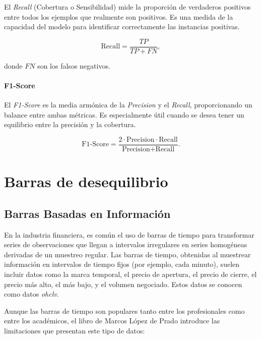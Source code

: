 \documentclass[a4paper,12pt, twoside]{report}
\begin{document}
El \textit{Recall} (Cobertura o Sensibilidad) mide la proporción de verdaderos positivos entre todos los ejemplos que realmente son positivos. Es una medida de la capacidad del modelo para identificar correctamente las instancias positivas.

\begin{equation}
\text{Recall} = \frac{TP}{TP + FN},
\end{equation}

donde $FN$ son los falsos negativos.

\subsubsection{F1-Score}

El \textit{F1-Score} es la media armónica de la \textit{Precision} y el \textit{Recall}, proporcionando un balance entre ambas métricas. Es especialmente útil cuando se desea tener un equilibrio entre la precisión y la cobertura.

\begin{equation}
\text{F1-Score} = \frac{2 \cdot \text{Precision} \cdot \text{Recall}}{\text{Precision} + \text{Recall}}.
\end{equation}


\chapter{Barras de desequilibrio}

\section{Barras Basadas en Información}

En la industria financiera, es común el uso de barras de tiempo para transformar 
series de observaciones que llegan a intervalos irregulares en series homogéneas 
derivadas de un muestreo regular. Las barras de tiempo, obtenidas al muestrear 
información en intervalos de tiempo fijos (por ejemplo, cada minuto), suelen incluir 
datos como la marca temporal, el precio de apertura, el precio de cierre, el precio 
más alto, el más bajo, y el volumen negociado. Estos datos se conocen como datos \textit{ohclv}.

Aunque las barras de tiempo son populares tanto entre los profesionales como entre los académicos, 
el libro de Marcos López de Prado introduce las limitaciones que presentan este tipo de datos:
\end{document}
